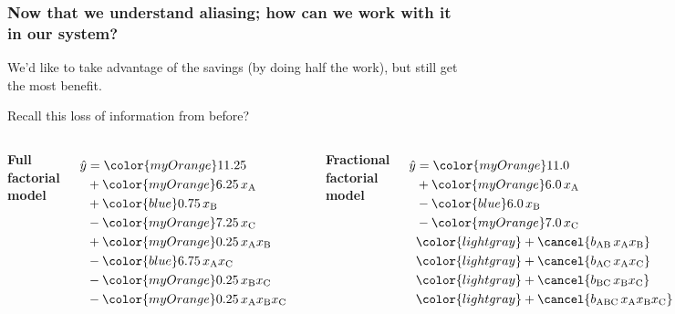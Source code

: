 \begin{frame}\frametitle{Now that we understand aliasing; how can we work with it in our system?}
	
	We'd like to take advantage of the savings (by doing half the work), but still get the most benefit.
	
	\vspace{0.2cm}
	Recall this loss of information from before?
	
	\vspace{-0.2cm}
	\begin{columns}[T]
			\begin{center}\textbf{Full factorial model}\end{center}
				\begin{align*}
					\hat{y} &= {\color{myOrange}11.25}\\
							&+ {\color{myOrange}6.25\,}x_\text{A}\\
							&+ {\color{blue}0.75\,}x_\text{B}\\
							&- {\color{myOrange}7.25\,}x_\text{C}\\
							&+ {\color{myOrange}0.25\,}x_\text{A}x_\text{B}\\
							&- {\color{blue}6.75\,}x_\text{A}x_\text{C}\\
							&- {\color{myOrange}0.25\,}x_\text{B}x_\text{C}\\
							&- {\color{myOrange}0.25\,}x_\text{A}x_\text{B}x_\text{C}		
				\end{align*}
			\vspace{1cm}
			\rule[3mm]{0.03cm}{45mm}
			\begin{center}\textbf{Fractional factorial model}\end{center}				
				\begin{align*}
					\hat{y} &= {\color{myOrange}11.0}\\
							&+ {\color{myOrange}6.0\,}x_\text{A}\\
							&- {\color{blue}6.0\,}x_\text{B}\\
							&- {\color{myOrange}7.0\,}x_\text{C}\\
							& \color{lightgray}+ \cancel{b_\text{AB}\,x_\text{A}x_\text{B}}\\
							& \color{lightgray}+ \cancel{b_\text{AC}\,x_\text{A}x_\text{C}}\\
							& \color{lightgray}+ \cancel{b_\text{BC}\,x_\text{B}x_\text{C}}\\
							& \color{lightgray}+ \cancel{b_\text{ABC}\,x_\text{A}x_\text{B}x_\text{C}}\\
				\end{align*}

	\end{columns}
\end{frame}

